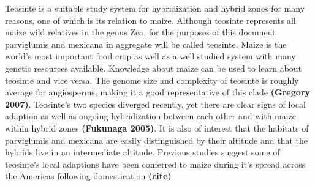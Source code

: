\documentclass[12pt]{amsart}
\newcommand{\mbh}[1]{\textcolor{red}{ \emph{\scriptsize  #1}} }
\begin{document}
Teosinte is a suitable study system for hybridization and hybrid zones for many reasons, one of which is its relation to maize.  
Although teosinte represents all maize wild relatives in the genus {Zea}, for the purposes of this document parviglumis and mexicana in aggregate will be called teosinte. 
Maize is the world's most important food crop as well as a well studied system with many genetic resources available.
Knowledge about maize can be used to learn about teosinte and vice versa.
The genome size and complexity of teosinte is roughly average for angiosperms, making it a good representative of this clade \textbf{(Gregory 2007)}. 
Teosinte's two species diverged recently, yet there are clear signs of local adaption as well as ongoing hybridization between each other and with maize within hybrid zones \textbf{(Fukunaga 2005)}.
It is also of interest that the habitats of parviglumis and mexicana are easily distinguished by their altitude and that the hybrids live in an intermediate altitude.
Previous studies suggest some of teosinte's local adaptions have been conferred to maize during it's spread across the Americas following domestication \textbf{(cite)} %
\end{document}

